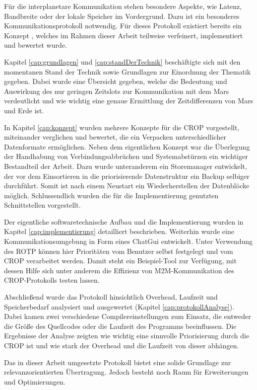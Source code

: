 
Für die interplanetare Kommunikation stehen besondere Aspekte, wie Latenz,
Bandbreite oder der lokale Speicher im Vordergrund. Dazu ist ein besonderes
Kommunikationsprotokoll notwendig. Für dieses Protokoll existiert
bereits ein Konzept \cite{Daher}, welches im Rahmen dieser Arbeit
teilweise verfeinert, implementiert und bewertet wurde.

Kapitel \ref{cap:grundlagen} und \ref{cap:standDerTechnik} beschäftigte sich
mit den momentanen Stand der Technik sowie Grundlagen zur Einordnung der
Thematik gegeben. Dabei wurde eine Übersicht gegeben, welche die Bedeutung und
Auswirkung des nur geringen Zeitslots zur Kommunikation mit dem Mars
verdeutlicht und wie wichtig eine genaue Ermittlung der Zeitdifferenzen von Mars
und Erde ist.

In Kapitel \ref{cap:konzept} wurden mehrere Konzepte für die CROP vorgestellt,
miteinander verglichen und bewertet, die ein Verpacken unterschiedlicher
Datenformate ermöglichen. Neben dem eigentlichen Konzept war die Überlegung der
Handhabung von Verbindungsabbrüchen und Systemabstürzen ein wichtiger
Bestandteil der Arbeit. Dazu wurde unteranderem ein Storemanager entwickelt,
der vor dem Einsortieren in die priorisierende Datenstruktur ein Backup selbiger
durchführt. Somit ist nach einem Neustart ein Wiederherstellen der Datenblöcke
möglich. Schlussendlich wurden die für die Implementierung genutzten
Schnittstellen vorgestellt.

Der eigentliche softwaretechnische Aufbau und die Implementierung wurden in
Kapitel \ref{cap:implementierung} detailliert beschrieben. Weiterhin wurde eine
Kommunikationsumgebung in Form eines ChatGui entwickelt. Unter Verwendung des ROTP
können hier Prioritäten vom Benutzer selbst festgelegt und vom CROP verarbeitet
werden. Damit steht ein Beispiel-Tool zur Verfügung, mit dessen Hilfe sich
unter anderem die Effizienz von M$2$M-Kommunikation des CROP-Protokolls testen
lassen.

Abschließend wurde das Protokoll hinsichtlich Overhead, Laufzeit und
Speicherbedarf analysiert und ausgewertet (Kapitel \ref{cap:protokollAnalyse}).
Dabei kamen zwei verschiedene Compilereinstellungen zum Einsatz, die entweder
die Größe des Quellcodes oder die Laufzeit des Programms beeinflussen. Die
Ergebnisse der Analyse zeigten wie wichtig eine sinnvolle Priorisierung durch
die CROP ist und wie stark der Overhead und die Laufzeit von dieser abhängen.

Das in dieser Arbeit umgesetzte Protokoll bietet eine solide
Grundlage zur relevanzorientierten Übertragung. Jedoch besteht noch Raum
für Erweiterungen und Optimierungen.


